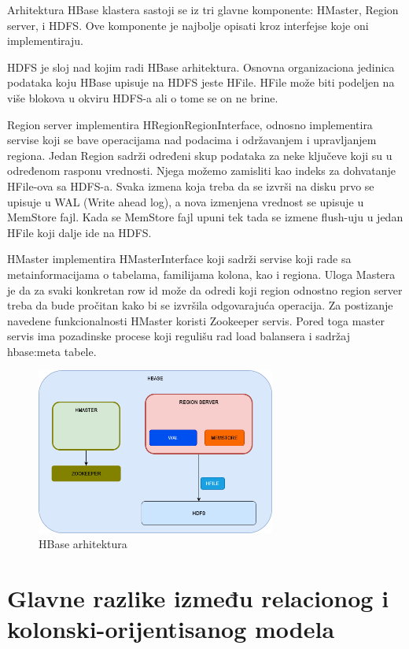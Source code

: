 \documentclass[12pt,oneside]{memoir}
\begin{document}
Arhitektura HBase klastera sastoji se iz tri glavne komponente: HMaster, Region server, i HDFS.  Ove komponente je najbolje opisati kroz interfejse koje oni implementiraju. 

HDFS je sloj nad kojim radi HBase arhitektura. Osnovna organizaciona jedinica podataka koju HBase upisuje na HDFS jeste HFile. HFile može biti podeljen na više blokova u okviru HDFS-a ali o tome se on ne brine. 

Region server implementira HRegionRegionInterface, odnosno implementira servise koji se bave operacijama nad podacima i održavanjem i upravljanjem regiona. Jedan Region sadrži određeni skup podataka za neke ključeve koji su u određenom rasponu vrednosti.  Njega možemo zamisliti kao indeks za dohvatanje HFile-ova sa HDFS-a.  Svaka izmena koja treba da se izvrši na disku prvo se upisuje u WAL (Write ahead log), a nova izmenjena vrednost se upisuje u MemStore fajl. Kada se MemStore fajl upuni tek tada se izmene flush-uju u jedan HFile koji dalje ide na HDFS. 

HMaster implementira HMasterInterface koji sadrži servise koji rade sa metainformacijama o tabelama, familijama kolona, kao i regiona. Uloga Mastera je da za svaki konkretan row id može da odredi koji region odnostno region server treba da bude pročitan kako bi se izvršila odgovarajuća operacija. Za postizanje navedene funkcionalnosti HMaster koristi Zookeeper \cite{BigTable} servis. Pored toga master servis ima pozadinske procese koji regulišu rad load balansera i sadržaj hbase:meta tabele.

\begin{figure}[!ht]
  \centering
  \includegraphics[width=0.7\textwidth]{hbase-arhitektura.png}
  \caption{HBase arhitektura}
  \label{fig:grafikon}
\end{figure}

\pagebreak

\section{Glavne razlike između relacionog i kolonski-orijentisanog modela}
\end{document}
